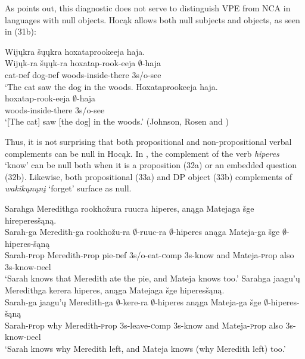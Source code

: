 \documentclass[output=paper]{LSP/langsci}
\begin{document}
As \citet{Fortin2007} points out, this diagnostic does not serve to distinguish VPE from NCA in languages with null objects. Hocąk allows both null subjects and objects, as seen in (31b):

\begin{exe}
\ex
\begin{xlist}
\ex
\glll Wijųkra šųųkra hoxataprookeeja haja.\\
Wijųk-ra šųųk-ra hoxatap-rook-eeja $\emptyset$-haja\\
cat-{\textsc def} dog-{\textsc def} woods-inside-there {\textsc 3s/o}-see\\
\trans `The cat saw the dog in the woods.
\ex
\glll Hoxataprookeeja haja.\\
hoxatap-rook-eeja $\emptyset$-haja\\
woods-inside-there {\textsc 3s/o}-see\\
\trans `[The cat] saw [the dog] in the woods.' (Johnson, Rosen and \citealt[7]{Schuck2013})
\end{xlist}
\end{exe}


Thus, it is not surprising that both propositional and non-propositional verbal complements can be null in Hocąk. In , the complement of the verb \emph{hiperes} `know' can be null both when it is a proposition (32a) or an embedded question (32b). Likewise, both propositional (33a) and DP object (33b) complements of \emph{wakikųnųnį} `forget' surface as null.

\begin{exe}
\ex
\begin{xlist}
\ex
\glll Sarahga Meredithga rookhožura ruucra hiperes, anąga Matejaga šge hireperesšąną.\\
Sarah-ga Meredith-ga rookhožu-ra $\emptyset$-ruuc-ra $\emptyset$-hiperes anąga Mateja-ga šge $\emptyset$-hiperes-šąną\\
Sarah-{\textsc prop} Meredith-{\textsc prop} pie-{\textsc def} {\textsc 3s/o}-eat-{\textsc comp} {\textsc 3s}-know and Mateja-{\textsc prop} also {\textsc 3s}-know-{\textsc decl}\\
\trans `Sarah knows that Meredith ate the pie, and Mateja knows too.'
\ex
\glll Sarahga jaagu'ų Meredithga kerera hiperes, anąga Matejaga šge hiperesšąną.\\
Sarah-ga jaagu'ų Meredith-ga $\emptyset$-kere-ra $\emptyset$-hiperes anąga Mateja-ga šge $\emptyset$-hiperes-šąną\\
Sarah-{\textsc prop} why Meredith-{\textsc prop} {\textsc 3s}-leave-{\textsc comp} {\textsc 3s}-know and Mateja-{\textsc prop} also {\textsc 3s}-know-{\textsc decl}\\
\trans `Sarah knows why Meredith left, and Mateja knows (why Meredith left) too.'
\end{xlist}
\end{exe}
\end{document}
